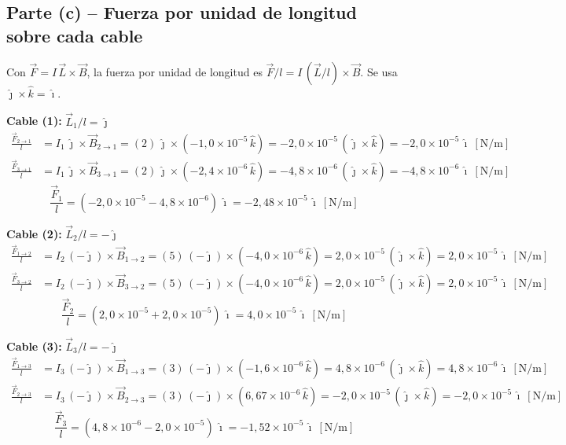 \documentclass[12pt,letterpaper]{article}
\begin{document}
\subsection*{Parte (c) -- Fuerza por unidad de longitud sobre cada cable}

Con $\vec{F} = I\,\vec{L}\times\vec{B}$, la fuerza por unidad de longitud es
$\vec{F}/l = I\,(\vec{L}/l)\times\vec{B}$. Se usa $\hat{\jmath}\times\hat{k} = \hat{\imath}$.

\medskip
\noindent\textbf{Cable (1):}\; $\vec{L}_1/l = \hat{\jmath}$
\begin{align*}
    \frac{\vec{F}_{2\to1}}{l} &= I_1\,\hat{\jmath}\times\vec{B}_{2\to1}
        = (2)\,\hat{\jmath}\times(-1{,}0\times10^{-5}\,\hat{k})
        = -2{,}0\times10^{-5}\,(\hat{\jmath}\times\hat{k})
        = -2{,}0\times10^{-5}\,\hat{\imath}\ [\text{N/m}] \\[4pt]
    \frac{\vec{F}_{3\to1}}{l} &= I_1\,\hat{\jmath}\times\vec{B}_{3\to1}
        = (2)\,\hat{\jmath}\times(-2{,}4\times10^{-6}\,\hat{k})
        = -4{,}8\times10^{-6}\,(\hat{\jmath}\times\hat{k})
        = -4{,}8\times10^{-6}\,\hat{\imath}\ [\text{N/m}]
\end{align*}
\[
    \boxed{\frac{\vec{F}_1}{l} = (-2{,}0\times10^{-5} - 4{,}8\times10^{-6})\,\hat{\imath}
    = -2{,}48\times10^{-5}\,\hat{\imath}\ [\text{N/m}]}
\]

\noindent\textbf{Cable (2):}\; $\vec{L}_2/l = -\hat{\jmath}$
\begin{align*}
    \frac{\vec{F}_{1\to2}}{l} &= I_2\,(-\hat{\jmath})\times\vec{B}_{1\to2}
        = (5)\,(-\hat{\jmath})\times(-4{,}0\times10^{-6}\,\hat{k})
        = 2{,}0\times10^{-5}\,(\hat{\jmath}\times\hat{k})
        = 2{,}0\times10^{-5}\,\hat{\imath}\ [\text{N/m}] \\[4pt]
    \frac{\vec{F}_{3\to2}}{l} &= I_2\,(-\hat{\jmath})\times\vec{B}_{3\to2}
        = (5)\,(-\hat{\jmath})\times(-4{,}0\times10^{-6}\,\hat{k})
        = 2{,}0\times10^{-5}\,(\hat{\jmath}\times\hat{k})
        = 2{,}0\times10^{-5}\,\hat{\imath}\ [\text{N/m}]
\end{align*}
\[
    \boxed{\frac{\vec{F}_2}{l} = (2{,}0\times10^{-5} + 2{,}0\times10^{-5})\,\hat{\imath}
    = 4{,}0\times10^{-5}\,\hat{\imath}\ [\text{N/m}]}
\]

\noindent\textbf{Cable (3):}\; $\vec{L}_3/l = -\hat{\jmath}$
\begin{align*}
    \frac{\vec{F}_{1\to3}}{l} &= I_3\,(-\hat{\jmath})\times\vec{B}_{1\to3}
        = (3)\,(-\hat{\jmath})\times(-1{,}6\times10^{-6}\,\hat{k})
        = 4{,}8\times10^{-6}\,(\hat{\jmath}\times\hat{k})
        = 4{,}8\times10^{-6}\,\hat{\imath}\ [\text{N/m}] \\[4pt]
    \frac{\vec{F}_{2\to3}}{l} &= I_3\,(-\hat{\jmath})\times\vec{B}_{2\to3}
        = (3)\,(-\hat{\jmath})\times(6{,}67\times10^{-6}\,\hat{k})
        = -2{,}0\times10^{-5}\,(\hat{\jmath}\times\hat{k})
        = -2{,}0\times10^{-5}\,\hat{\imath}\ [\text{N/m}]
\end{align*}
\[
    \boxed{\frac{\vec{F}_3}{l} = (4{,}8\times10^{-6} - 2{,}0\times10^{-5})\,\hat{\imath}
    = -1{,}52\times10^{-5}\,\hat{\imath}\ [\text{N/m}]}
\]
\end{document}
